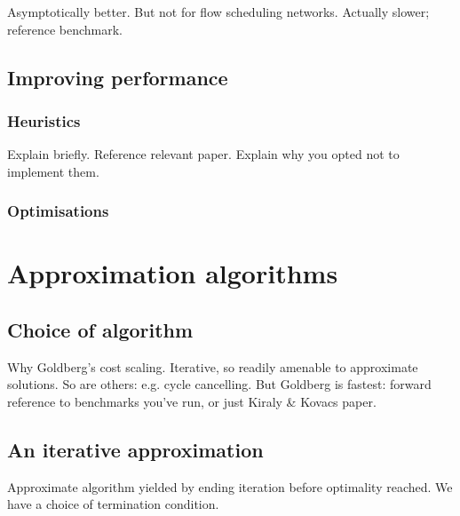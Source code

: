
Asymptotically better. But not for flow scheduling networks. Actually slower; reference benchmark.

\subsection{Improving performance}

\subsubsection{Heuristics}


Explain briefly. Reference relevant paper. Explain why you opted not to implement them.

\subsubsection{Optimisations}


\section{Approximation algorithms} \label{sec:impl-approx}

\subsection{Choice of algorithm} \label{sec:impl-approx-choice}

Why Goldberg's cost scaling. Iterative, so readily amenable to approximate solutions. So are others: e.g. cycle cancelling. But Goldberg is fastest: forward reference to benchmarks you've run, or just Kiraly \& Kovacs paper.

\subsection{An iterative approximation}

Approximate algorithm yielded by ending iteration before optimality reached. We have a choice of termination condition.

